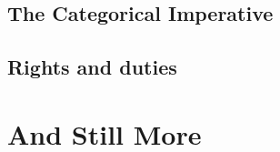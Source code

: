 \documentclass[justified]{tufte-book}
\begin{document}
\hypertarget{the-categorical-imperative}{%
\section{The Categorical Imperative}\label{the-categorical-imperative}}

\hypertarget{rights-and-duties}{%
\section{Rights and duties}\label{rights-and-duties}}

\hypertarget{and-still-more}{%
\chapter*{And Still More}\label{and-still-more}}
\end{document}
